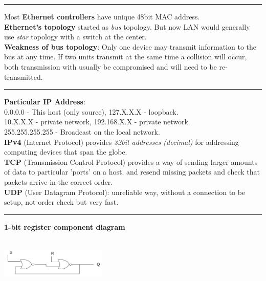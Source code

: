 \documentclass[8pt,a4paper,landscape]{article}
\begin{document}
\begin{spacing}{-1}
\begin{multicols*}{3}
\hrule \noindent
Most \textbf{Ethernet controllers} have unique 48bit MAC address. \\
\textbf{Ethernet's topology} started as \textit{bus} topology. But now LAN would generally use \textit{star} topology with a switch at the center. \\
\textbf{Weakness of bus topology}: Only one device may transmit information to the bus at any time. If two units transmit at the same time a collision will occur, both transmission with usually be compromised and will need to be re-transmitted.

\hrule \noindent
\textbf{Particular IP Address}: \\
0.0.0.0 - This host (only source), 127.X.X.X - loopback. \\
10.X.X.X - private network, 192.168.X.X - private network. \\
255.255.255.255 - Broadcast on the local network. \\
\textbf{IPv4} (Internet Protocol) provides \textit{32bit addresses (decimal)} for addressing computing devices that span the globe. \\
\textbf{TCP} (Transmission Control Protocol) provides a way of sending larger amounts of data to particular 'ports' on a host.
and resend missing packets and check that packets arrive in the correct order. \\
\textbf{UDP} (User Datagram Protocol): unreliable way, without a connection to be setup, not order check but very fast. \\


\hrule \noindent
\textbf{1-bit register component diagram}
\begin{center}
    \includegraphics[width=2in,height=1in]{./flip-flop.png} \\
\end{center}

\end{multicols*}
\end{spacing}
\end{document}
